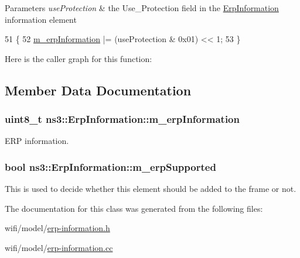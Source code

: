 \begin{DoxyParams}{Parameters}
{\em use\+Protection} & the Use\+\_\+\+Protection field in the \hyperlink{classns3_1_1ErpInformation}{Erp\+Information} information element \\
\hline
\end{DoxyParams}

\begin{DoxyCode}
51 \{
52   \hyperlink{classns3_1_1ErpInformation_a05781466d5cc96ea7f8832082f14d644}{m\_erpInformation} |= (useProtection & 0x01) << 1;
53 \}
\end{DoxyCode}


Here is the caller graph for this function\+:




\subsection{Member Data Documentation}
\subsubsection[{\texorpdfstring{m\+\_\+erp\+Information}{m_erpInformation}}]{\setlength{\rightskip}{0pt plus 5cm}uint8\+\_\+t ns3\+::\+Erp\+Information\+::m\+\_\+erp\+Information\hspace{0.3cm}{\ttfamily [private]}}\hypertarget{classns3_1_1ErpInformation_a05781466d5cc96ea7f8832082f14d644}{}\label{classns3_1_1ErpInformation_a05781466d5cc96ea7f8832082f14d644}


E\+RP information. 

\subsubsection[{\texorpdfstring{m\+\_\+erp\+Supported}{m_erpSupported}}]{\setlength{\rightskip}{0pt plus 5cm}bool ns3\+::\+Erp\+Information\+::m\+\_\+erp\+Supported\hspace{0.3cm}{\ttfamily [private]}}\hypertarget{classns3_1_1ErpInformation_a2fc05e18d7f707191748342793413f68}{}\label{classns3_1_1ErpInformation_a2fc05e18d7f707191748342793413f68}


This is used to decide whether this element should be added to the frame or not. 



The documentation for this class was generated from the following files\+:\begin{DoxyCompactItemize}
\item 
wifi/model/\hyperlink{erp-information_8h}{erp-\/information.\+h}\item 
wifi/model/\hyperlink{erp-information_8cc}{erp-\/information.\+cc}\end{DoxyCompactItemize}
